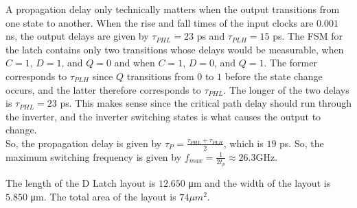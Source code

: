 A propagation delay only technically matters when the output transitions from one state to another.
When the rise and fall times of the input clocks are $0.001$ \si{\nano\second}, the output delays are given by $\tau_{PHL} = 23$ \si{\pico\second} and $\tau_{PLH} = 15$ \si{\pico\second}.
The FSM for the latch contains only two transitions whose delays would be measurable, when $C = 1$, $D = 1$, and $Q = 0$ and when $C = 1$, $D = 0$, and $Q = 1$.
The former corresponds to $\tau_{PLH}$ since $Q$ transitions from $0$ to $1$ before the state change occurs, and the latter therefore corresponds to $\tau_{PHL}$. The longer of the two delays is $\tau_{PHL} = 23$ \si{\pico\second}.
This makes sense since the critical path delay should run through the inverter, and the inverter switching states is what causes the output to change. \\

So, the propagation delay is given by $\tau_{P} = \frac{ \tau_{PHL} + \tau_{PLH} }{ 2 }$, which is $19$ \si{\pico\second}. So, the maximum switching frequency is given by $f_{max} = \frac{1}{2 t_{p}} \approx 26.3$\si{\giga\hertz}.

The length of the D Latch layout is $12.650$ \si{\micro\meter} and the width of the layout is $5.850$ \si{\micro\meter}. The total area of the layout is $74 \mu m^2$.

\FloatBarrier

